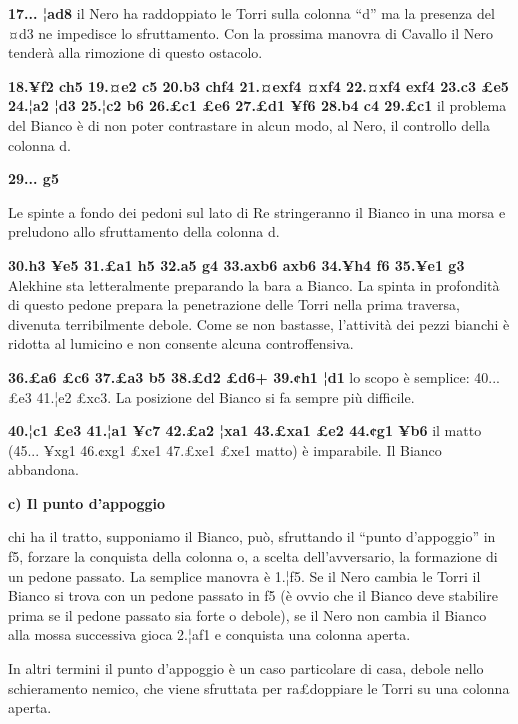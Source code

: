 \textbf{17... ¦ad8} il Nero ha raddoppiato le Torri sulla colonna ``d''
ma la presenza del ¤d3 ne impedisce lo sfruttamento. Con la prossima
manovra di Cavallo il Nero tenderà alla rimozione di questo ostacolo.

\textbf{18.¥f2 ch5 19.¤e2 c5 20.b3 chf4 21.¤exf4 ¤xf4 22.¤xf4 exf4 23.c3
£e5 24.¦a2 ¦d3 25.¦c2 b6 26.£c1 £e6 27.£d1 ¥f6 28.b4 c4 29.£c1} il
problema del Bianco è di non poter contrastare in alcun modo, al Nero,
il controllo della colonna d.

\textbf{29... g5}


Le spinte a fondo dei pedoni sul lato di Re stringeranno il Bianco in
una morsa e preludono allo sfruttamento della colonna d.

\textbf{30.h3 ¥e5 31.£a1 h5 32.a5 g4 33.axb6 axb6 34.¥h4 f6 35.¥e1 g3}
Alekhine sta letteralmente preparando la bara a Bianco. La spinta in
profondità di questo pedone prepara la penetrazione delle Torri nella
prima traversa, divenuta terribilmente debole. Come se non bastasse,
l'attività dei pezzi bianchi è ridotta al lumicino e non consente alcuna
controffensiva.

\textbf{36.£a6 £c6 37.£a3 b5 38.£d2 £d6+ 39.¢h1 ¦d1} lo scopo è
semplice: 40... £e3 41.¦e2 £xc3. La posizione del Bianco si fa sempre
più difficile.

\textbf{40.¦c1 £e3 41.¦a1 ¥c7 42.£a2 ¦xa1 43.£xa1 £e2 44.¢g1 ¥b6} il
matto (45... ¥xg1 46.¢xg1 £xe1 47.£xe1 £xe1 matto) è imparabile. Il
Bianco abbandona.

\textbf{c) Il punto d'appoggio}


chi ha il tratto, supponiamo il Bianco, può, sfruttando il ``punto
d'appoggio'' in f5, forzare la conquista della colonna o, a scelta
dell'avversario, la formazione di un pedone passato. La semplice manovra
è 1.¦f5. Se il Nero cambia le Torri il Bianco si trova con un pedone
passato in f5 (è ovvio che il Bianco deve stabilire prima se il pedone
passato sia forte o debole), se il Nero non cambia il Bianco alla mossa
successiva gioca 2.¦af1 e conquista una colonna aperta.

In altri termini il punto d'appoggio è un caso particolare di casa,
debole nello schieramento nemico, che viene sfruttata per ra£doppiare le
Torri su una colonna aperta.
